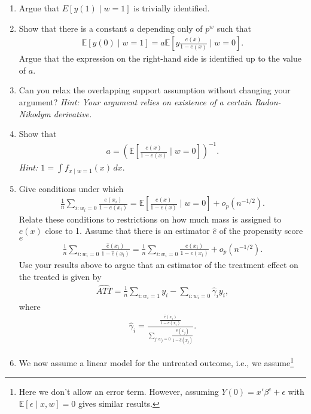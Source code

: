 \documentclass[a4paper]{scrartcl}
\newcommand{\E}{\mathbb{E}}
\begin{document}
\begin{enumerate}
	\item Argue that $E[y(1) \mid w = 1]$ is trivially identified.
	\item Show that there is a constant $a$ depending only of $p^w$ such that 
	\begin{align*}
		\E \left[y(0) \mid w = 1\right] = a \E \left[y \frac{e(x)}{1 - e(x)}\mid w =0 \right].
	\end{align*}
	Argue that the expression on the right-hand side is identified up to the value of $a$.
	\item 
	Can you relax the overlapping support assumption without changing your argument? \emph{Hint: Your argument relies on existence of a certain Radon-Nikodym derivative.}
	\item 
	Show that 
	\begin{align*}
		a = \left(\E \left[ \frac{e(x)}{1 - e(x)} \mid w = 0 \right]\right)^{-1}. 
	\end{align*}
	\emph{Hint: $1 = \int f_{x \mid w = 1} (x) \, dx$}. 
	\item Give conditions under which 
	\begin{align*}
		\frac{1}{n} \sum_{i: w_i = 0} \frac{e(x_i)}{1 - e(x_i)} 
		= \E \left[\frac{e(x)}{1 - e(x)} \mid w = 0 \right] + o_p\left( n^{-1/2} \right). 
	\end{align*}
	Relate these conditions to restrictions on how much mass is assigned to $e(x)$ close to 1.
	Assume that there is an estimator $\hat{e}$ of the propensity score $e$
	\begin{align*}
		\frac{1}{n} \sum_{i: w_i = 0} \frac{\hat{e}(x_i)}{1 - \hat{e}(x_i)} 
		= \frac{1}{n} \sum_{i: w_i = 0} \frac{e(x_i)}{1 - e(x_i)} 
		+ o_p\left( n^{-1/2} \right).
	\end{align*}
	Use your results above to argue that an estimator of the treatment effect on the treated is given by 
	\begin{align*}
		\widehat{ATT} = \frac{1}{n} \sum_{i : w_i = 1} y_i 
		- \sum_{i: w_i = 0} \hat{\gamma}_i y_i, 
	\end{align*}
	where 
	\begin{align*}
		\hat{\gamma}_i = \frac{\frac{\hat{e}(x_i)}{1 - \hat{e}(x_i)}}{\sum_{j: w_j = 0} \frac{\hat{e}(x_j)}{1 - \hat{e}(x_j)}}.
	\end{align*}
	\item 
	We now assume a linear model for the untreated outcome, i.e., we assume\footnote{%
	Here we don't allow an error term. However, assuming $Y(0) = x'\beta^{c} + \epsilon$ with $\E[\epsilon \mid x, w] = 0$ gives similar results.
}
\end{enumerate}
\end{document}
